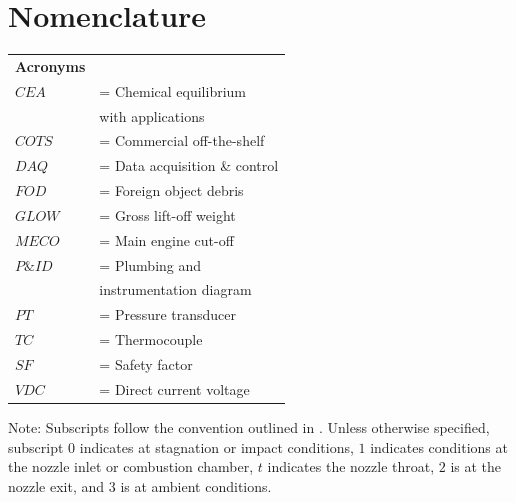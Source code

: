 \documentclass[9pt]{article} %
\numberwithin{equation}{section} %
\begin{document}
\section{Nomenclature} \label{sec: nomenclature}
\vspace{0.1cm}
\begin{tabular}{ll}
\textbf{Acronyms} \\ 
$CEA $ & = \quad Chemical equilibrium \\ 
$ $ & \qquad \enskip with applications \\
$COTS $ & = \quad Commercial off-the-shelf \\
$DAQ $ & = \quad Data acquisition \& control \\
$FOD $ & = \quad Foreign object debris \\
$GLOW $ & = \quad Gross lift-off weight \\
$MECO$ & = \quad Main engine cut-off \\
$P\&ID $ & = \quad Plumbing and \\
$ $ & \qquad \enskip instrumentation diagram\\
$PT $ & = \quad Pressure transducer \\
$TC $ & = \quad Thermocouple \\
$SF $ & = \quad Safety factor \\
$VDC $ & = \quad Direct current voltage \\
\end{tabular} 
\vspace{0.2cm} \newline
Note: Subscripts follow the convention outlined in \cite{rpe}. Unless otherwise specified, subscript $0$ indicates at stagnation or impact conditions, $1$ indicates conditions at the nozzle inlet or combustion chamber, $t$ indicates the nozzle throat, $2$ is at the nozzle exit, and $3$ is at ambient conditions.
\end{document}
